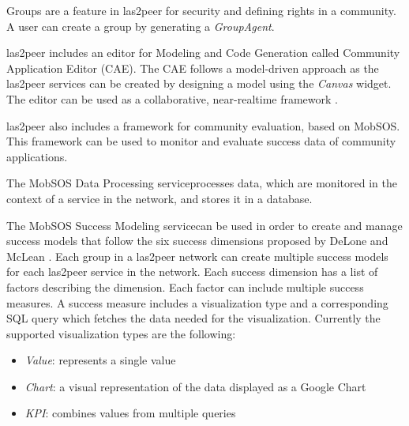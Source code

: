 
Groups are a feature in las2peer for security and defining rights in a community. 
A user can create a group by generating a \emph{GroupAgent}. 

las2peer includes an editor for Modeling and Code Generation called Community Application Editor (CAE). 
The CAE follows a model-driven approach as the  las2peer services can be created by designing a model using the \emph{Canvas} widget. The editor can be used as a collaborative, near-realtime framework \cite{dND*16}. 

las2peer also includes a framework for community evaluation, based on MobSOS. This framework can be used to monitor and evaluate success data of community applications.

The MobSOS Data Processing service\footnotemark processes data, which are monitored in the context of a service in the network, and stores it in a database.


The MobSOS Success Modeling service\footnotemark can be used in order to create and manage success models that follow the six success dimensions proposed by DeLone and McLean \cite{DeMc92}.
Each group in a las2peer network can create multiple success models for each las2peer service in the network. 
Each success dimension has a list of factors describing the dimension. 
Each factor can include multiple success measures. 
A success measure includes a visualization type and a corresponding SQL query which fetches the data needed for the visualization. 
Currently the supported visualization types are the following:
\begin{itemize}
  \item \emph{Value}: represents a single value
  \item \emph{Chart}: a visual representation of the data displayed as a Google Chart \footnotemark
  \item \emph{KPI}: combines values from multiple queries 
\end{itemize}

